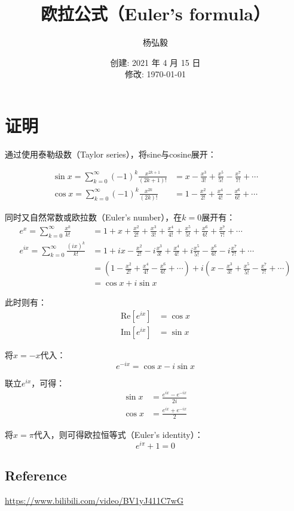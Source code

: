 \documentclass[11pt]{article}
\title{欧拉公式（Euler's formula）}
\author{杨弘毅}
\date{创建: 2021 年 4 月 15 日 \\修改: \today}
\begin{document}
\maketitle

\section{证明}

通过使用泰勒级数（Taylor series），将sine与cosine展开：

\begin{align*}
    \sin x = \sum_{k=0}^{\infty} (-1)^{k} \frac{x^{2k+1}}{(2k+1)!} &= x - \frac{x^3}{3!} + \frac{x^5}{5!} - \frac{x^7}{7!} + \cdots \\
    \cos x = \sum_{k=0}^{\infty} (-1)^{k} \frac{x^{2k}}{(2k)!} &= 1 - \frac{x^2}{2!} + \frac{x^4}{4!} - \frac{x^6}{6!} + \cdots
\end{align*}

同时又自然常数或欧拉数（Euler's number），在$k=0$展开有：
\begin{align*}
    e^x = \sum_{k=0}^{\infty} \frac{x^k}{k!} &= 1 + x + \frac{x^2}{2!} + \frac{x^3}{3!} + \frac{x^4}{4!} + \frac{x^5}{5!} + \frac{x^6}{6!} + \frac{x^7}{7!} + \cdots \\
    e^{ix} = \sum_{k=0}^{\infty} \frac{(ix)^k}{k!} &= 1 + ix - \frac{x^2}{2!} - i\frac{x^3}{3!} + \frac{x^4}{4!} + i\frac{x^5}{5!} - \frac{x^6}{6!} -i\frac{x^7}{7!} + \cdots \\
    &= \left( 1 - \frac{x^2}{2!} + \frac{x^4}{4!} -\frac{x^6}{6!} +\cdots \right) + i\left(x - \frac{x^3}{3!} + \frac{x^5}{5!} - \frac{x^7}{7!} + \cdots \right) \\
    &= \cos x + i \sin x
\end{align*}

此时则有：
\begin{align*}
    \text{Re}\left[e^{ix}\right] &= \cos x \\
    \text{Im}\left[e^{ix}\right] &= \sin x
\end{align*}

将$x=-x$代入：
\begin{equation*}
    e^{-ix} = \cos x - i \sin x
\end{equation*}

联立$e^{ix}$，可得：
\begin{align*}
    \sin x &= \frac{e^{ix}-e^{-ix}}{2i} \\
    \cos x &= \frac{e^{ix}+e^{-ix}}{2} 
\end{align*}

将$x = \pi$代入，则可得欧拉恒等式（Euler's identity）：
\begin{equation*}
    e^{i\pi} + 1 = 0
\end{equation*}


\subsection*{Reference}
\url{https://www.bilibili.com/video/BV1yJ411C7wG}
\end{document}
